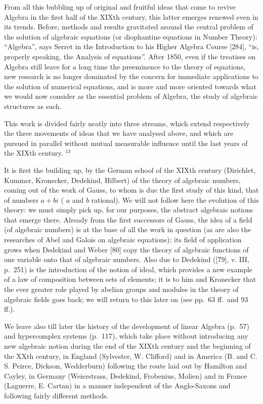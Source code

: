 From all this bubbling up of original and fruitful ideas that come to revive Algebra in the first half of the XIXth century, this latter emerges renewed even in its trends. Before, methods and results gravitated around the central problem of the solution of algebraic equations (or diophantine equations in Number Theory): ``Algebra'', says Serret in the Introduction to his Higher Algebra Course {[}284{]}, ``is, properly speaking, the Analysis of equations''. After 1850, even if the treatises on Algebra still leave for a long time the preeminence to the theory of equations, new research is no longer dominated by the concern for immediate applications to the solution of numerical equations, and is more and more oriented towards what we would now consider as the essential problem of Algebra, the study of algebraic structures as such.

This work is divided fairly neatly into three streams, which extend respectively the three movements of ideas that we have analysed above, and which are pursued in parallel without mutual measurable influence until the last years of the XIXth century. \(^{13}\)

It is first the building up, by the German school of the XIXth century (Dirichlet, Kummer, Kronecker, Dedekind, Hilbert) of the theory of algebraic numbers, coming out of the work of Gauss, to whom is due the first study of this kind, that of numbers \(a + bi\) ( \(a\) and \(b\) rational). We will not follow here the evolution of this theory: we must simply pick up, for our purposes, the abstract algebraic notions that emerge there. Already from the first successors of Gauss, the idea of a field (of algebraic numbers) is at the base of all the work in question (as are also the researches of Abel and Galois on algebraic equations); its field of application grows when Dedekind and Weber {[}80{]} copy the theory of algebraic functions of one variable onto that of algebraic numbers. Also due to Dedekind ({[}79{]}, v. III, p.~251) is the introduction of the notion of ideal, which provides a new example of a law of composition between sets of elements; it is to him and Kronecker that the ever greater role played by abelian groups and modules in the theory of algebraic fields goes back; we will return to this later on (see pp.~63 ff.~and 93 ff.).

We leave also till later the history of the development of linear Algebra (p.~57) and hypercomplex systems (p.~117), which take place without introducing any new algebraic notion during the end of the XIXth century and the beginning of the XXth century, in England (Sylvester, W. Clifford) and in America (B. and C. S. Peirce, Dickson, Wedderburn) following the route laid out by Hamilton and Cayley, in Germany (Weierstrass, Dedekind, Frobenius, Molien) and in France (Laguerre, E. Cartan) in a manner independent of the Anglo-Saxons and following fairly different methods.

